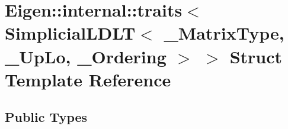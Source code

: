\hypertarget{struct_eigen_1_1internal_1_1traits_3_01_simplicial_l_d_l_t_3_01___matrix_type_00_01___up_lo_00_01___ordering_01_4_01_4}{}\section{Eigen\+:\+:internal\+:\+:traits$<$ Simplicial\+L\+D\+LT$<$ \+\_\+\+Matrix\+Type, \+\_\+\+Up\+Lo, \+\_\+\+Ordering $>$ $>$ Struct Template Reference}
\label{struct_eigen_1_1internal_1_1traits_3_01_simplicial_l_d_l_t_3_01___matrix_type_00_01___up_lo_00_01___ordering_01_4_01_4}
\subsection*{Public Types}

